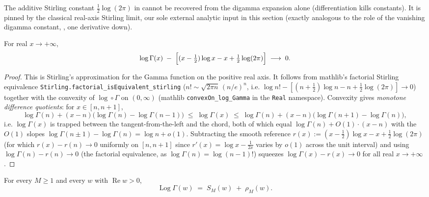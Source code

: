 The additive Stirling constant $\tfrac12\log(2\pi)$ in  cannot be
recovered from the digamma expansion alone (differentiation kills constants). It is
pinned by the classical real-axis Stirling limit, our sole external analytic input in
this section (exactly analogous to the role of the vanishing digamma constant,
, one derivative down).

\begin{lemma}
\label{lem:hz_anchor}
\leanok
For real $x\to+\infty$,
\[
  \log\Gamma(x)\;-\;\Bigl[(x-\tfrac12)\log x-x+\tfrac12\log(2\pi)\Bigr]\;\longrightarrow\;0 .
\]
\end{lemma}

\begin{proof}
\leanok
This is Stirling's approximation for the Gamma function on the positive real axis. It
follows from mathlib's factorial Stirling equivalence
\texttt{Stirling.factorial\_isEquivalent\_stirling}
($n!\sim\sqrt{2\pi n}\,(n/e)^n$, i.e.
$\log n!-[(n+\tfrac12)\log n-n+\tfrac12\log(2\pi)]\to0$) together with the convexity
of $\log\circ\Gamma$ on $(0,\infty)$ (mathlib \texttt{convexOn\_log\_Gamma} in the
\texttt{Real} namespace). Convexity gives \emph{monotone difference quotients}: for
$x\in[n,n+1]$,
\[
  \log\Gamma(n)+ (x-n)\bigl(\log\Gamma(n)-\log\Gamma(n-1)\bigr)
  \;\le\;\log\Gamma(x)\;\le\;
  \log\Gamma(n)+(x-n)\bigl(\log\Gamma(n+1)-\log\Gamma(n)\bigr),
\]
i.e. $\log\Gamma(x)$ is trapped between the tangent-from-the-left and the chord, both of
which equal $\log\Gamma(n)+O(1)\cdot(x-n)$ with the $O(1)$ slopes
$\log\Gamma(n{\pm}1)-\log\Gamma(n)=\log n+o(1)$. Subtracting the smooth reference
$r(x):=(x-\tfrac12)\log x-x+\tfrac12\log(2\pi)$ (for which $r(x)-r(n)\to0$ uniformly on
$[n,n+1]$ since $r'(x)=\log x-\tfrac1{2x}$ varies by $o(1)$ across the unit interval) and
using $\log\Gamma(n)-r(n)\to0$ (the factorial equivalence, as $\log\Gamma(n)=\log(n-1)!$)
squeezes $\log\Gamma(x)-r(x)\to0$ for all real $x\to+\infty$.
\end{proof}

\begin{theorem}
\label{thm:hz_loggamma_em}
\leanok
{}
For every $M\ge1$ and every $w$ with $\operatorname{Re}w>0$,
\[
  \operatorname{Log}\Gamma(w)\;=\;S_M(w)\;+\;\rho_M(w).
\]
\end{theorem}

